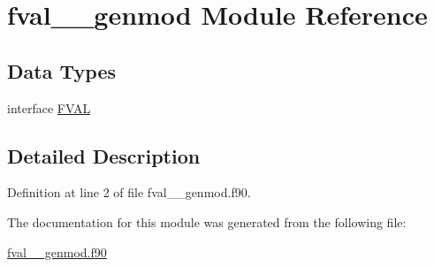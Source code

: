 \hypertarget{classfval____genmod}{\section{fval\+\_\+\+\_\+genmod Module Reference}
\label{classfval____genmod}
}
\subsection*{Data Types}
\begin{DoxyCompactItemize}
\item 
interface \hyperlink{interfacefval____genmod_1_1FVAL}{F\+V\+A\+L}
\end{DoxyCompactItemize}


\subsection{Detailed Description}


Definition at line 2 of file fval\+\_\+\+\_\+genmod.\+f90.



The documentation for this module was generated from the following file\+:\begin{DoxyCompactItemize}
\item 
\hyperlink{fval____genmod_8f90}{fval\+\_\+\+\_\+genmod.\+f90}\end{DoxyCompactItemize}
